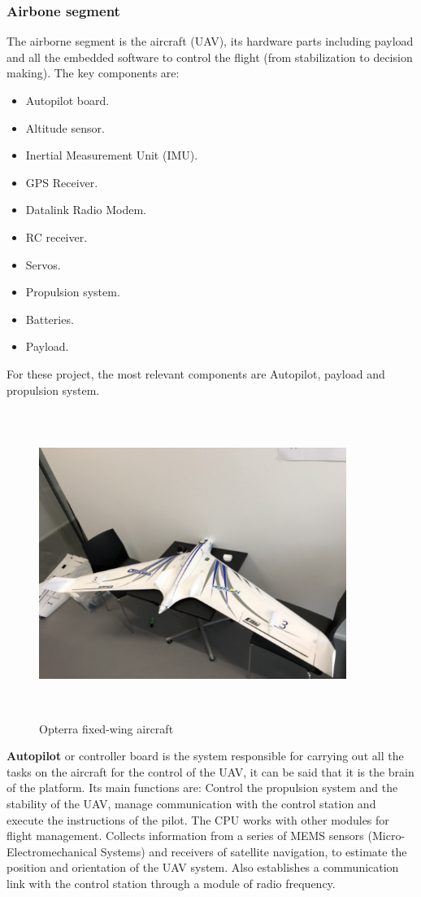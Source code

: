 \subsubsection{Airbone segment}
The airborne segment is the aircraft (UAV), its hardware parts including payload and all the embedded software to control the flight (from stabilization to decision making). The key components are:
\begin{itemize}
    \item Autopilot board.
    \item Altitude sensor.
    \item Inertial Measurement Unit (IMU).
    \item GPS Receiver.
    \item Datalink Radio Modem.
    \item RC receiver.
    \item Servos.
    \item Propulsion system.
    \item Batteries.
    \item Payload.
\end{itemize}
For these project, the most relevant components are Autopilot, payload and propulsion system.
\begin{figure}[H]
\centering
\includegraphics[width=10cm,height=10cm,keepaspectratio]{imagenes/opterra.jpg}
\caption{Opterra fixed-wing aircraft}
\label{fig:Optera}
\end{figure}
\textbf{ Autopilot} or controller board is the system responsible for carrying out all the tasks on the aircraft for the control of the UAV, it can be said that it is the brain of the platform. Its main functions are: Control the propulsion system and the stability of the UAV, manage communication with the control station and execute the instructions of the pilot. The CPU works with other modules for flight management. Collects information from a series of MEMS sensors (Micro-Electromechanical Systems) and receivers of satellite navigation, to estimate the position and orientation of the UAV system. Also establishes a communication link with the control station through a module of radio frequency.\cite{Edgar}

